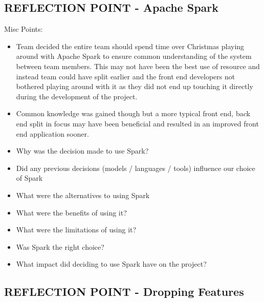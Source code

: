 \documentclass{l3proj}
\begin{document}


\subsection{REFLECTION POINT - Apache Spark}
\label{sec:sparkreflection}
Misc Points:
\begin{itemize}
\item Team decided the entire team should spend time over Christmas playing around with Apache Spark to ensure common understanding of the system between team members. This may not have been the best use of resource and instead team could have split earlier and the front end developers not bothered playing around with it as they did not end up touching it directly during the development of the project. 
\item Common knowledge was gained though but a more typical front end, back end split in focus may have been beneficial and resulted in an improved front end application sooner.
\item Why was the decision made to use Spark?
\item Did any previous decisions (models / languages / tools) influence our choice of Spark
\item What were the alternatives to using Spark
\item What were the benefits of using it?
\item What were the limitations of using it?
\item Was Spark the right choice?
\item What impact did deciding to use Spark have on the project?
\end{itemize}



\subsection{REFLECTION POINT - Dropping Features}
\label{sec:droppingreflection}
\end{document}
